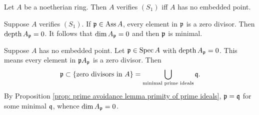     \begin{example}\label{eg: S_1 is equivalent to A has no embedded point}
        Let $A$ be a noetherian ring.
        Then $A$ verifies $(S_1)$ iff $A$ has no embedded point.
        
        Suppose $A$ verifies $(S_1)$.
        If ${\mathfrak{p}} \in \operatorname{Ass} A$, every element in ${\mathfrak{p}}$ is a zero divisor.
        Then $\operatorname{depth} A_{{\mathfrak{p}}} = 0$.
        It follows that $\dim A_{\mathfrak{p}} = 0$ and then ${\mathfrak{p}}$ is minimal. 

        Suppose $A$ has no embedded point.
        Let ${\mathfrak{p}} \in \operatorname{Spec} A$ with $\operatorname{depth} A_{\mathfrak{p}} = 0$.
        This means every element in ${\mathfrak{p}} A_{\mathfrak{p}}$ is a zero divisor.
        Then 
        \[ {\mathfrak{p}} \subset \{\text{zero divisors in } A\} = \bigcup_{\text{minimal prime ideals}} {\mathfrak{q}}. \]
        By Proposition \ref{prop: prime avoidance lemma primity of prime ideals}, ${\mathfrak{p}} = {\mathfrak{q}}$ for some minimal ${\mathfrak{q}}$, whence $\dim A_{\mathfrak{p}} = 0$. 
    \end{example}


        

